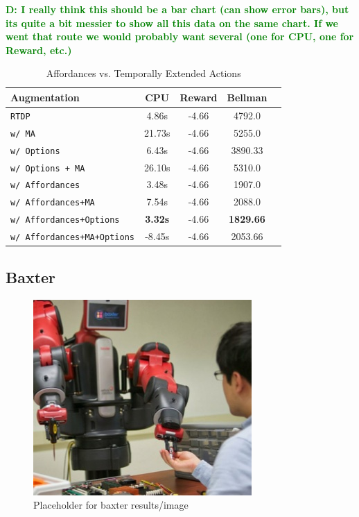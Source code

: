 \documentclass[conference]{IEEEtran}
\newcommand{\dnote}[1]{\textcolor{Green}{\textbf{D: #1}}}
\begin{document}
\dnote{I really think this should be a bar chart (can show error bars), but its quite a bit messier to show all this data on the same chart. If we went that route we would probably want several (one for CPU, one for Reward, etc.)}
\begin{table}[H]
\centering
\begin{tabular}{ l  || c c c c}
  Augmentation 						&	CPU	&	Reward 	& Bellman \\ \hline
  \texttt{RTDP}  						&	4.86s	&	-4.66		&	4792.0		\\
  \texttt{w/ MA}  						&	21.73s	&	-4.66		&	5255.0		\\
  \texttt{w/ Options}  					&	6.43s	&	-4.66		&	3890.33		\\
  \texttt{w/ Options + MA}  				&	26.10s	&	-4.66		&	5310.0		\\
  \texttt{w/ Affordances}  				& 	3.48s	&	-4.66		&	1907.0		\\
  \texttt{w/ Affordances+MA}  			& 	7.54s	&	-4.66		&	2088.0		\\
  \texttt{w/ Affordances+Options}  		& 	{\bf 3.32s}	&	-4.66		&	{\bf 1829.66}		\\
  \texttt{w/ Affordances+MA+Options}  	& 	-8.45s	&	-4.66		&	2053.66		\\
\end{tabular}
\caption{Affordances vs. Temporally Extended Actions}
\label{table:temp_ext_acts_results}
\end{table}

\subsection{Baxter}

\begin{figure}[H]
\centering
\includegraphics[scale=0.195]{figures/baxter_temp.jpg}%
  \caption{Placeholder for baxter results/image}
  \label{fig:baxter_results}
\end{figure}
\end{document}
